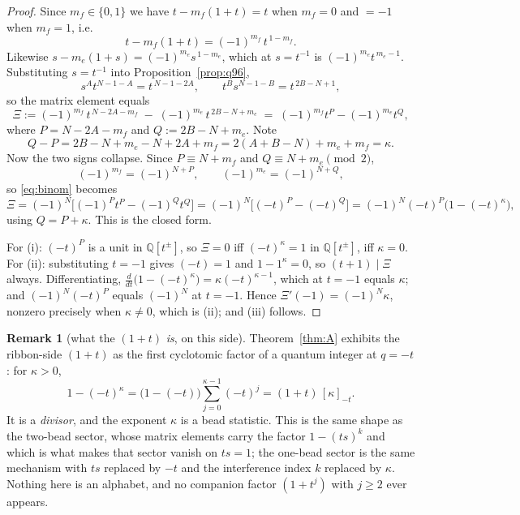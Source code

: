 \documentclass[11pt]{article}
\theoremstyle{definition}
\newtheorem{remark}[theorem]{Remark}
\newcommand{\Q}{\mathbb{Q}}
\begin{document}
\begin{proof}
Since $m_f\in\{0,1\}$ we have $t-m_f(1+t)=t$ when $m_f=0$ and $=-1$ when $m_f=1$, i.e.
\[
  t-m_f(1+t)=(-1)^{m_f}\,t^{\,1-m_f}.
\]
Likewise $s-m_e(1+s)=(-1)^{m_e}s^{\,1-m_e}$, which at $s=t^{-1}$ is
$(-1)^{m_e}t^{\,m_e-1}$.  Substituting $s=t^{-1}$ into Proposition~\ref{prop:q96},
\[
  s^At^{N-1-A}=t^{\,N-1-2A},\qquad t^Bs^{N-1-B}=t^{\,2B-N+1},
\]
so the matrix element equals
\begin{equation}\label{eq:binom}
  \Xi:=(-1)^{m_f}\,t^{\,N-2A-m_f}\;-\;(-1)^{m_e}\,t^{\,2B-N+m_e}
     \;=\;(-1)^{m_f}t^{P}-(-1)^{m_e}t^{Q},
\end{equation}
where $P=N-2A-m_f$ and $Q:=2B-N+m_e$.  Note
\[
  Q-P=2B-N+m_e-N+2A+m_f=2(A+B-N)+m_e+m_f=\kappa .
\]
Now the two signs collapse.  Since $P\equiv N+m_f$ and $Q\equiv N+m_e \pmod 2$,
\[
  (-1)^{m_f}=(-1)^{N+P},\qquad (-1)^{m_e}=(-1)^{N+Q},
\]
so \eqref{eq:binom} becomes
\[
  \Xi=(-1)^{N}\bigl[(-1)^{P}t^{P}-(-1)^{Q}t^{Q}\bigr]
     =(-1)^{N}\bigl[(-t)^{P}-(-t)^{Q}\bigr]
     =(-1)^{N}(-t)^{P}\bigl(1-(-t)^{\kappa}\bigr),
\]
using $Q=P+\kappa$.  This is the closed form.

For (i): $(-t)^P$ is a unit in $\Q[t^{\pm}]$, so $\Xi=0$ iff $(-t)^{\kappa}=1$ in
$\Q[t^{\pm}]$, iff $\kappa=0$.  For (ii): substituting $t=-1$ gives $(-t)=1$ and
$1-1^{\kappa}=0$, so $(t+1)\mid\Xi$ always.  Differentiating,
$\frac{d}{dt}\bigl(1-(-t)^{\kappa}\bigr)=\kappa(-t)^{\kappa-1}$, which at $t=-1$ equals
$\kappa$; and $(-1)^N(-t)^P$ equals $(-1)^N$ at $t=-1$.  Hence
$\Xi'(-1)=(-1)^{N}\kappa$, nonzero precisely when $\kappa\neq0$, which is (ii); and (iii)
follows.
\end{proof}

\begin{remark}[what the $(1+t)$ \emph{is}, on this side]\label{rem:cyclotomic}
Theorem~\ref{thm:A} exhibits the ribbon-side $(1+t)$ as the first cyclotomic factor of a
quantum integer at $q=-t$: for $\kappa>0$,
\[
  1-(-t)^{\kappa}=\bigl(1-(-t)\bigr)\sum_{j=0}^{\kappa-1}(-t)^{j}=(1+t)\,[\kappa]_{-t}.
\]
It is a \emph{divisor}, and the exponent $\kappa$ is a bead statistic.  This is the same
shape as the two-bead sector, whose matrix elements carry the factor $1-(ts)^{k}$
\cite[Thm.~4.1(2)]{Q96} and which is what makes that sector vanish on $ts=1$; the one-bead
sector is the same mechanism with $ts$ replaced by $-t$ and the interference index $k$
replaced by $\kappa$.  Nothing here is an alphabet, and no companion factor $(1+t^{j})$
with $j\ge2$ ever appears.
\end{remark}
\end{document}

